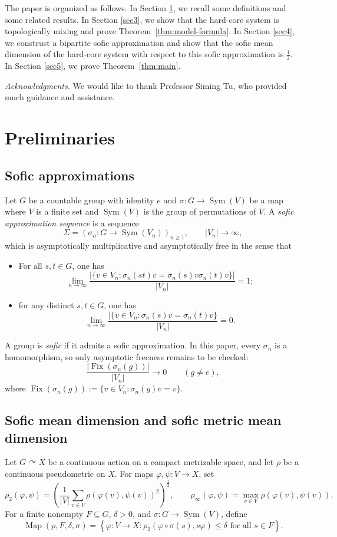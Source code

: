 \documentclass[12pt,a4paper]{amsart}
\theoremstyle{definition}
\newcommand{\Map}{\operatorname{Map}}
\newcommand{\Sym}{\operatorname{Sym}}
\newcommand{\Fix}{\operatorname{Fix}}
\begin{document}
    The paper is organized as follows. In Section \ref{sec2}, we recall some definitions and some related results. In Section \ref{sec3}, we show that the hard-core system is topologically mixing and prove Theorem~\ref{thm:model-formula}. In Section \ref{sec4}, we construst a bipartite sofic approximation and show that the sofic mean dimension of the hard-core system with respect to this sofic approximation is $\frac{1}{2}$. In Section \ref{sec5}, we prove Theorem~\ref{thm:main}.
    
\emph{Acknowledgments.} We would like to thank Professor Siming Tu, who provided much guidance and assistance.
	
	\section{Preliminaries}\label{sec2}
	
	\subsection{Sofic approximations}
	
	Let $G$ be a countable group with identity $e$ and $\sigma: G \to \Sym(V)$ be a map where $V$ is a finite set and $\Sym(V)$ is the group of permutations of $V$.  A \emph{sofic approximation sequence} is a sequence
	\[
	\Sigma=(\sigma_n:G\to\Sym(V_n))_{n\ge1},
	\qquad |V_n|\to\infty,
	\]
	which is asymptotically multiplicative and asymptotically free in the sense that
  \begin{itemize}
      \item [(i)] For all $s,t \in G$, one has
      $$\lim_{n \rightarrow \infty}\frac{|\{v \in V_n:\sigma_{n}(st)v=\sigma_{n}(s)v\sigma_{n}(t)v\}|}{|V_{n}|}=1;$$
      \item [(ii)] for any distinct $s,t \in G$, one has $$\lim_{n \rightarrow \infty}\frac{|\{v \in V_n:\sigma_{n}(s)v=\sigma_{n}(t)v\}}{|V_n|}=0.$$
  \end{itemize}
  A group is \emph{sofic} if it admits a sofic approximation.
   In this paper, every $\sigma_n$ is a homomorphism, so only asymptotic freeness remains to be checked: 
	\begin{equation}\label{eq:sofic-free}
		\frac{|\Fix(\sigma_n(g))|}{|V_n|}\longrightarrow0
		\qquad(g\ne e),
	\end{equation}
	where $\Fix(\sigma_n(g)):=\{v\in V_n:\sigma_n(g)v=v\}$.
    \subsection{Sofic mean dimension and sofic metric mean dimension}
	Let $G\curvearrowright X$ be a continuous action on a compact metrizable space, and let $\rho$ be a continuous pseudometric on $X$.  For maps $\varphi,\psi:V\to X$, set
	\[
	\rho_2(\varphi,\psi)
	=\left(\frac1{|V|}\sum_{v\in V}\rho(\varphi(v),\psi(v))^2\right)^{\frac{1}{2}},
	\qquad
	\rho_\infty(\varphi,\psi)
	=\max_{v\in V}\rho(\varphi(v),\psi(v)).
	\]
	For a finite nonempty $F\subseteq G$, $\delta>0$, and $\sigma:G\to\Sym(V)$, define
	\[
	\Map(\rho,F,\delta,\sigma)
	=\left\{\varphi:V\to X:
	\rho_2(\varphi\circ\sigma(s),s\varphi)\leq \delta
	\text{ for all }s\in F\right\}.
	\]
	
\end{document}
